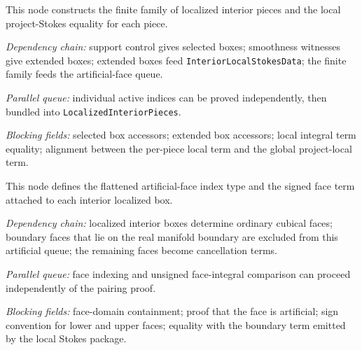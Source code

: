 \begin{definition}
  \label{obl:m7_localized_interior_piece_family}
  This node constructs the finite family of localized interior pieces and the
  local project-Stokes equality for each piece.

  \emph{Dependency chain:}
  support control gives selected boxes; smoothness witnesses give extended
  boxes; extended boxes feed \texttt{InteriorLocalStokesData}; the finite family
  feeds the artificial-face queue.

  \emph{Parallel queue:}
  individual active indices can be proved independently, then bundled into
  \texttt{LocalizedInteriorPieces}.

  \emph{Blocking fields:}
  selected box accessors; extended box accessors; local integral term equality;
  alignment between the per-piece local term and the global project-local term.
\end{definition}

\begin{definition}
  \label{obl:m7_artificial_face_labels}
  This node defines the flattened artificial-face index type and the signed face
  term attached to each interior localized box.

  \emph{Dependency chain:}
  localized interior boxes determine ordinary cubical faces; boundary faces
  that lie on the real manifold boundary are excluded from this artificial
  queue; the remaining faces become cancellation terms.

  \emph{Parallel queue:}
  face indexing and unsigned face-integral comparison can proceed independently
  of the pairing proof.

  \emph{Blocking fields:}
  face-domain containment; proof that the face is artificial; sign convention
  for lower and upper faces; equality with the boundary term emitted by the
  local Stokes package.
\end{definition}

